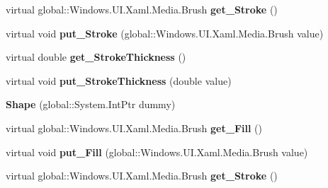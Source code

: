 \begin{DoxyCompactItemize}
\item 
\mbox{\label{class_windows_1_1_u_i_1_1_xaml_1_1_shapes_1_1_shape_ac48e00b135fa8e1130bee32942bbee5c}} 
virtual global\+::\+Windows.\+U\+I.\+Xaml.\+Media.\+Brush {\bfseries get\+\_\+\+Stroke} ()
\item 
\mbox{\label{class_windows_1_1_u_i_1_1_xaml_1_1_shapes_1_1_shape_a801ec283f413b3ba03d57ce8b2bccdc0}} 
virtual void {\bfseries put\+\_\+\+Stroke} (global\+::\+Windows.\+U\+I.\+Xaml.\+Media.\+Brush value)
\item 
\mbox{\label{class_windows_1_1_u_i_1_1_xaml_1_1_shapes_1_1_shape_a758d9f0e1b12c843580d28f3254f63ca}} 
virtual double {\bfseries get\+\_\+\+Stroke\+Thickness} ()
\item 
\mbox{\label{class_windows_1_1_u_i_1_1_xaml_1_1_shapes_1_1_shape_a3bfb547dd85a92a03c0f72a2ca6af30d}} 
virtual void {\bfseries put\+\_\+\+Stroke\+Thickness} (double value)
\item 
\mbox{\label{class_windows_1_1_u_i_1_1_xaml_1_1_shapes_1_1_shape_aef3c79f20646c23080a348eb29a0394e}} 
{\bfseries Shape} (global\+::\+System.\+Int\+Ptr dummy)
\item 
\mbox{\label{class_windows_1_1_u_i_1_1_xaml_1_1_shapes_1_1_shape_a10c17e0315cc803297aef00e98586e85}} 
virtual global\+::\+Windows.\+U\+I.\+Xaml.\+Media.\+Brush {\bfseries get\+\_\+\+Fill} ()
\item 
\mbox{\label{class_windows_1_1_u_i_1_1_xaml_1_1_shapes_1_1_shape_ab293dba968233df2740d66a0e1f23957}} 
virtual void {\bfseries put\+\_\+\+Fill} (global\+::\+Windows.\+U\+I.\+Xaml.\+Media.\+Brush value)
\item 
\mbox{\label{class_windows_1_1_u_i_1_1_xaml_1_1_shapes_1_1_shape_ac48e00b135fa8e1130bee32942bbee5c}} 
virtual global\+::\+Windows.\+U\+I.\+Xaml.\+Media.\+Brush {\bfseries get\+\_\+\+Stroke} ()

\end{DoxyCompactItemize}
